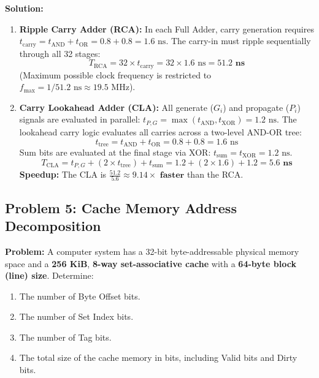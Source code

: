 \textbf{Solution:}
\begin{enumerate}[label=\bfseries\alph*.]
    \item \textbf{Ripple Carry Adder (RCA):}
    In each Full Adder, carry generation requires $t_{\text{carry}} = t_{\text{AND}} + t_{\text{OR}} = 0.8 + 0.8 = 1.6\text{ ns}$.
    The carry-in must ripple sequentially through all 32 stages:
    \[ T_{\text{RCA}} = 32 \times t_{\text{carry}} = 32 \times 1.6\text{ ns} = \mathbf{51.2\text{ ns}} \]
    (Maximum possible clock frequency is restricted to $f_{\text{max}} = 1 / 51.2\text{ ns} \approx 19.5\text{ MHz}$).
    \item \textbf{Carry Lookahead Adder (CLA):}
    All generate ($G_i$) and propagate ($P_i$) signals are evaluated in parallel: $t_{P,G} = \max(t_{\text{AND}}, t_{\text{XOR}}) = 1.2\text{ ns}$.
    The lookahead carry logic evaluates all carries across a two-level AND-OR tree:
    \[ t_{\text{tree}} = t_{\text{AND}} + t_{\text{OR}} = 0.8 + 0.8 = 1.6\text{ ns} \]
    Sum bits are evaluated at the final stage via XOR: $t_{\text{sum}} = t_{\text{XOR}} = 1.2\text{ ns}$.
    \[ T_{\text{CLA}} = t_{P,G} + (2 \times t_{\text{tree}}) + t_{\text{sum}} = 1.2 + (2 \times 1.6) + 1.2 = \mathbf{5.6\text{ ns}} \]
    \textbf{Speedup:} The CLA is $\frac{51.2}{5.6} \approx \mathbf{9.14\times\text{ faster}}$ than the RCA.
\end{enumerate}

\subsection{Problem 5: Cache Memory Address Decomposition}
\textbf{Problem:} A computer system has a 32-bit byte-addressable physical memory space and a \textbf{256 KiB}, \textbf{8-way set-associative cache} with a \textbf{64-byte block (line) size}.
Determine:
\begin{enumerate}[label=\bfseries\alph*.]
    \item The number of Byte Offset bits.
    \item The number of Set Index bits.
    \item The number of Tag bits.
    \item The total size of the cache memory in bits, including Valid bits and Dirty bits.
\end{enumerate}

